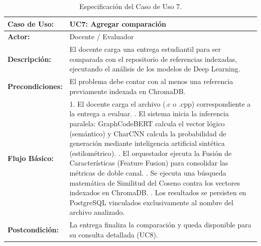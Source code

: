 \begin{table}[H]
	\centering
	\begin{tabular}{|p{3cm}|p{11cm}|}
		\hline
		\rowcolor[HTML]{E7F3FF}
		\textbf{Caso de Uso:}    & \textbf{UC7: Agregar comparación}                                                                                                                                \\ \hline
		\textbf{Actor:}          & Docente / Evaluador                                                                                                                                              \\ \hline
		\textbf{Descripción:}    & El docente carga una entrega estudiantil para ser comparada con el repositorio de referencias indexadas, ejecutando el análisis de los modelos de Deep Learning. \\ \hline
		\textbf{Precondiciones:} & El problema debe contar con al menos una referencia previamente indexada en ChromaDB.                                                                            \\ \hline
		\textbf{Flujo Básico:}   &
		1. El docente carga el archivo (.c o .cpp) correspondiente a la entrega a evaluar. \newline
		2. El sistema inicia la inferencia paralela: GraphCodeBERT calcula el vector lógico (semántico) y CharCNN calcula la probabilidad de generación mediante inteligencia artificial sintética (estilométrico). \newline
		3. El orquestador ejecuta la Fusión de Características (Feature Fusion) para consolidar las métricas de doble canal. \newline
		4. Se ejecuta una búsqueda matemática de Similitud del Coseno contra los vectores indexados en ChromaDB. \newline
		5. Los resultados se persisten en PostgreSQL vinculados exclusivamente al nombre del archivo analizado.                                                                                     \\ \hline
		\textbf{Postcondición:}  & La entrega finaliza la comparación y queda disponible para su consulta detallada (UC8).                                                                          \\ \hline
	\end{tabular}
	\caption{Especificación del Caso de Uso 7.}
\end{table}

